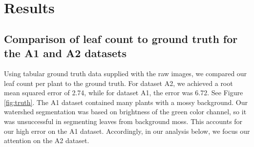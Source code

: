 \documentclass[paper=A4,bibliography=totocnumbered]{scrartcl}
\begin{document}
\section{Results}


\subsection{Comparison of leaf count to ground truth for the A1 and A2 datasets}

Using tabular ground truth data supplied with the raw images, we compared our leaf count per plant to the ground truth. For dataset A2, we achieved a root mean squared error of 2.74, while for dataset A1, the error was 6.72. See Figure \ref{fig:truth}. The A1 dataset contained many plants with a mossy background. Our watershed segmentation was based on brightness of the green color channel, so it was unsuccessful in segmenting leaves from background moss. This accounts for our high error on the A1 dataset. Accordingly, in our analysis below, we focus our attention on the A2 dataset.
\end{document}
